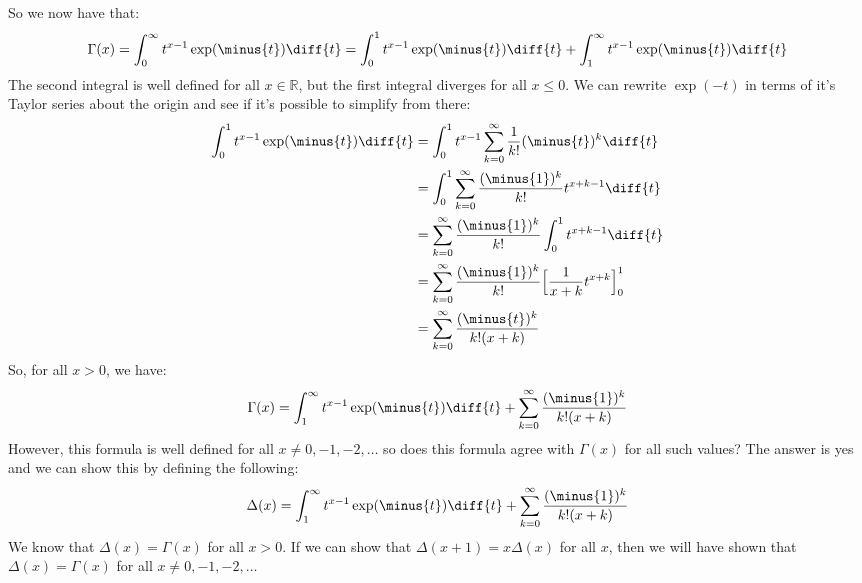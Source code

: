 \documentclass[crop=false,class=book,oneside]{standalone}
\begin{document}
        So we now have that:
        \begin{equation}
            \Gamma(x)=
            \int_{0}^{\infty}t^{x-1}\exp(\minus{t})\diff{t}
            =\int_{0}^{1}t^{x-1}\exp(\minus{t})\diff{t}+
            \int_{1}^{\infty}t^{x-1}\exp(\minus{t})\diff{t}
        \end{equation}
        The second integral is well defined for all $x\in\mathbb{R}$,
        but the first integral diverges for all $x\leq{0}$.
        We can rewrite $\exp(\minus{t})$ in terms of it's
        Taylor series about the origin and see if it's possible to
        simplify from there:
        \begin{align}
            \int_{0}^{1}t^{x-1}\exp(\minus{t})\diff{t}
            &=\int_{0}^{1}t^{x-1}
            \sum_{k=0}^{\infty}
                \frac{1}{k!}(\minus{t})^{k}\diff{t}\\
            &=\int_{0}^{1}\sum_{k=0}^{\infty}
            \frac{(\minus{1})^{k}}{k!}t^{x+k-1}\diff{t}\\
            &=\sum_{k=0}^{\infty}\frac{(\minus{1})^{k}}{k!}
            \int_{0}^{1}t^{x+k-1}\diff{t}\\
            &=\sum_{k=0}^{\infty}\frac{(\minus{1})^{k}}{k!}
                \Big[\frac{1}{x+k}t^{x+k}\Big]_{0}^{1}\\
            &=\sum_{k=0}^{\infty}\frac{(\minus{t})^{k}}{k!(x+k)}
        \end{align}
        So, for all $x>0$, we have:
        \begin{equation}
            \Gamma(x)=
            \int_{1}^{\infty}t^{x-1}\exp(\minus{t})\diff{t}+
            \sum_{k=0}^{\infty}\frac{(\minus{1})^{k}}{k!(x+k)}
        \end{equation}
        However, this formula is well defined for all
        $x\ne{0},\minus{1},\minus{2},\dots$ so does this formula
        agree with $\Gamma(x)$ for all such values? The answer is
        yes and we can show this by defining the following:
        \begin{equation}
            \Delta(x)=
            \int_{1}^{\infty}t^{x-1}\exp(\minus{t})\diff{t}+
            \sum_{k=0}^{\infty}\frac{(\minus{1})^{k}}{k!(x+k)}
        \end{equation}
        We know that $\Delta(x)=\Gamma(x)$ for all
        $x>0$. If we can show that $\Delta(x+1)=x\Delta(x)$ for
        all $x$, then we will have shown that $\Delta(x)=\Gamma(x)$
        for all $x\ne{0},\minus{1},\minus{2},\dots$
\end{document}
